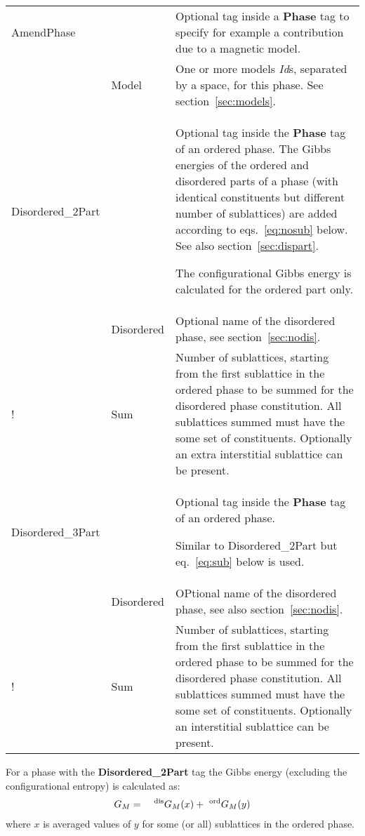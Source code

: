 \documentclass{article}
\begin{document}
\begin{tabular}{|p{} p{} p{}|}
  AmendPhase & & Optional tag inside a {\bf Phase} tag to specify
               for example a contribution due to a magnetic model.\\
           & Model & One or more models {\em Id}s, separated by a space, for 
             this phase.  See section~\ref{sec:models}.\\\hline

  Disordered\_2Part & & Optional tag inside the {\bf Phase} tag of an 
              ordered phase.
              The Gibbs energies of the ordered and disordered parts
              of a phase (with identical constituents but different
              number of sublattices) are added according to
              eqs.~\ref{eq:nosub} below.  See also section~\ref{sec:dispart}.

              The configurational Gibbs energy is calculated for
              the ordered part only.  \\

   & Disordered & Optional name of the disordered  phase, see section~\ref{sec:nodis}.\\

!  & Sum & Number of sublattices, starting from the first sublattice in the
              ordered phase to be summed for the disordered phase
              constitution.  All sublattices summed must have the some
              set of constituents.  Optionally an extra interstitial
              sublattice can be present.\\\hline

   Disordered\_3Part & & Optional tag inside the {\bf Phase} tag of an
              ordered phase.

              Similar to Disordered\_2Part but eq.~\ref{eq:sub} below is used.\\

        & Disordered & OPtional name of the disordered phase, see also section~\ref{sec:nodis}.\\

!  & Sum & Number of sublattices, starting from the first sublattice in the
              ordered phase to be summed for the disordered phase
              constitution.  All sublattices summed must have the some
              set of constituents.  Optionally an interstitial sublattice
              can be present.\\\hline

\end{tabular}

\bigskip
For a phase with the {\bf Disordered\_2Part} tag the Gibbs energy
(excluding the configurational entropy) is calculated as:
\begin{eqnarray}
G_M &=& ~^{\rm dis}G_M(x) + ~^{\rm ord}G_M(y) \label{eq:nosub}
\end{eqnarray}
where $x$ is averaged values of $y$ for some (or all) sublattices in the
ordered phase.
\end{document}
